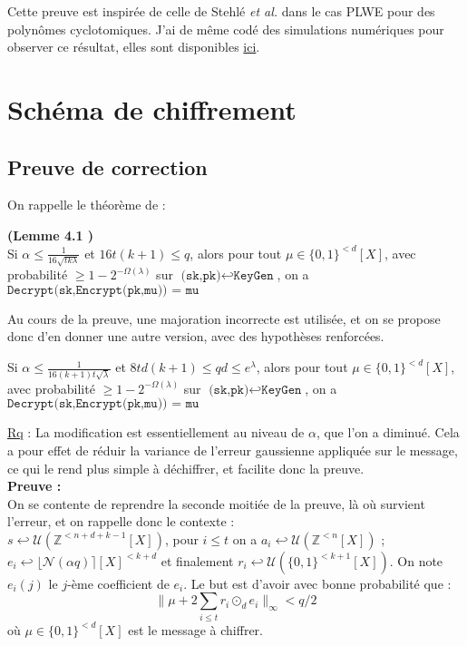 \documentclass[11pt,a4paper]{article}
\begin{document}
Cette preuve est inspirée de celle de Stehlé \textit{et al.} \cite{hlawka} dans le cas PLWE pour des polynômes cyclotomiques. J'ai de même codé des simulations numériques pour observer ce résultat, elles sont disponibles \href{https://github.com/Hazdard/mplwe-sage/blob/main/mplwe.ipynb}{ici}.
\section{Schéma de chiffrement}

\subsection{Preuve de correction}

On rappelle le théorème de \cite{mplwe} : 
\begin{theorem}\textbf{(Lemme 4.1 \cite{mplwe})} \\
Si $\alpha \leq \frac{1}{16\sqrt{tk\lambda}}$ et  $16t(k+1)\leq q$, alors pour tout $\mu \in \{0,1\}^{<d}[X]$, avec probabilité $\geq 1 - 2^{-\Omega(\lambda)}$ sur $\texttt{(sk,pk)}\hookleftarrow\texttt{KeyGen} $, on a $\texttt{Decrypt(sk,Encrypt(pk,mu)) = mu}$ 
\end{theorem}

Au cours de la preuve, une majoration incorrecte est utilisée, et on se propose donc d'en donner une autre version, avec des hypothèses renforcées.

\begin{theorem}
Si $\alpha \leq \frac{1}{16(k+1)t\sqrt{\lambda}}$ et  $8td(k+1)\leq qd\leq e^\lambda$, alors pour tout $\mu \in \{0,1\}^{<d}[X]$, avec probabilité $\geq 1 - 2^{-\Omega(\lambda)}$ sur $\texttt{(sk,pk)}\hookleftarrow\texttt{KeyGen} $, on a $\texttt{Decrypt(sk,Encrypt(pk,mu)) = mu}$ 
\end{theorem}


\underline{Rq} : La modification est essentiellement au niveau de $\alpha$, que l'on a diminué. Cela a pour effet de réduir la variance de l'erreur gaussienne appliquée sur le message, ce qui le rend plus simple à déchiffrer, et facilite donc la preuve.
\\

\textbf{Preuve :} \\
On se contente de reprendre la seconde moitiée de la preuve, là où survient l'erreur, et on rappelle donc le contexte : \\

$s \hookleftarrow \mathcal{U}(\mathbb{Z}^{<n+d+k-1}[X])$, pour $i\leq t$ on a $a_i \hookleftarrow \mathcal{U}(\mathbb{Z}^{<n}[X])$ ; $e_i \hookleftarrow \lfloor \mathcal{N}(\alpha q)\rceil[X]^{<k+d}$ et finalement $r_i \hookleftarrow \mathcal{U}(\{0,1\}^{<k+1}[X])$. On note $e_i(j)$ le $j$-ème coefficient de $e_i$. Le but est d'avoir avec bonne probabilité que : 
\[\|\mu + 2\sum_{i \leq t}r_i \odot_d e_i  \|_\infty < q/2 \] où $\mu \in \{0,1\}^{<d}[X]$ est le message à chiffrer. 
\end{document}
